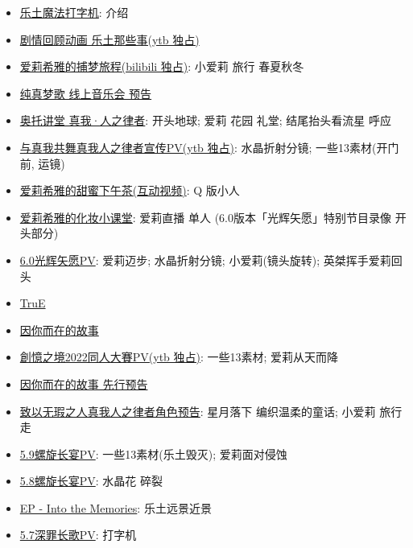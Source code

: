 \documentclass[a4paper]{article}
\begin{document}
\begin{itemize}
    \item \href{https://www.bilibili.com/video/BV1f24y1d7tP/}{乐土魔法打字机}: 介绍
    \item \href{https://www.youtube.com/watch?v=p_aPQhXCVCM}{剧情回顾动画 乐土那些事(ytb 独占)}
    \item \href{https://www.bilibili.com/video/BV1ZW4y1t7Zf/}{爱莉希雅的捕梦旅程(bilibili 独占)}: 小爱莉 旅行 春夏秋冬
    \item \href{https://www.bilibili.com/bangumi/play/ep672059/}{纯真梦歌 线上音乐会 预告}
    \item \href{https://www.bilibili.com/video/BV1q14y147EC/}{奥托讲堂 真我·人之律者}: 开头地球; 爱莉 花园 礼堂; 结尾抬头看流星 呼应
    \item \href{https://www.youtube.com/watch?v=mj-lnw1XlN0}{与真我共舞真我人之律者宣传PV(ytb 独占)}: 水晶折射分镜; 一些13素材(开门前, 运镜)
    \item \href{https://www.bilibili.com/video/BV1Ta411Z7KE/}{爱莉希雅的甜蜜下午茶(互动视频)}: Q 版小人
    \item \href{https://www.bilibili.com/video/BV12T411w7CN/}{爱莉希雅的化妆小课堂}: 爱莉直播 单人 (6.0版本「光辉矢愿」特别节目录像 开头部分)
    \item \href{https://www.bilibili.com/video/BV1Mg411k7U5/}{6.0光辉矢愿PV}: 爱莉迈步; 水晶折射分镜; 小爱莉(镜头旋转); 英桀挥手爱莉回头
    \item \href{https://www.bilibili.com/video/BV1sg411y7cZ/}{TruE}
    \item \href{https://www.bilibili.com/video/BV1fY4y1F7GL/}{因你而在的故事}
    \item \href{https://www.youtube.com/watch?v=psC2zgpPuPQ}{創憶之境2022同人大賽PV(ytb 独占)}: 一些13素材; 爱莉从天而降
    \item \href{https://www.bilibili.com/video/BV1Ee4y1D7ci/}{因你而在的故事 先行预告}
    \item \href{https://www.bilibili.com/video/BV1DS4y1t7rs/}{致以无瑕之人真我人之律者角色预告}: 星月落下 编织温柔的童话; 小爱莉 旅行 走
    \item \href{https://www.bilibili.com/video/BV1Ra411X7Hr/}{5.9螺旋长宴PV}: 一些13素材(乐土毁灭); 爱莉面对侵蚀
    \item \href{https://www.bilibili.com/video/BV1sP4y1F7iQ/}{5.8螺旋长宴PV}: 水晶花 碎裂
    \item \href{https://www.bilibili.com/video/BV18Y4y1Y7Hc/}{EP - Into the Memories}: 乐土远景近景
    \item \href{https://www.bilibili.com/video/BV1nY411j74v/}{5.7深罪长歌PV}: 打字机

\end{itemize}
\end{document}
